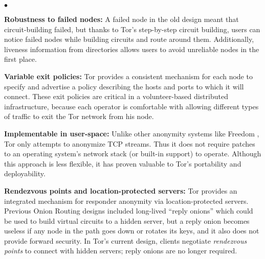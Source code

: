 \documentclass[times,10pt,twocolumn]{article}
\newenvironment{tightlist}{\begin{list}{$\bullet$}{
  \setlength{\itemsep}{0mm}
    \setlength{\parsep}{0mm}
    }}{\end{list}}
\begin{document}
\begin{tightlist}
\item \textbf{Robustness to failed nodes:} A failed node in the old design
meant that circuit-building failed, but thanks to Tor's step-by-step
circuit building, users can notice failed
nodes while building circuits and route around them.  Additionally,
liveness information from directories allows users to avoid
unreliable nodes in the first place.
%

\item \textbf{Variable exit policies:} Tor provides a consistent
mechanism for
each node to specify and advertise a policy describing the hosts and
ports to which it will connect. These exit policies
are critical in a volunteer-based distributed infrastructure, because
each operator is comfortable with allowing different types of traffic
to exit the Tor network from his node.

\item \textbf{Implementable in user-space:} Unlike other anonymity systems
like Freedom \cite{freedom2-arch}, Tor only attempts to anonymize TCP
streams. Thus it does not require patches to an operating system's network
stack (or built-in support) to operate.  Although this approach is less
flexible, it has proven valuable to Tor's portability and deployability.

\item \textbf{Rendezvous points and location-protected servers:}
Tor provides an integrated mechanism for responder anonymity via
location-protected servers.  Previous Onion Routing designs included
long-lived ``reply onions'' which could be used to build virtual circuits
to a hidden server, but a reply onion becomes useless if any node in
the path goes down or rotates its keys, and it also does not provide
forward security.  In Tor's current design, clients negotiate {\it
rendezvous points} to connect with hidden servers; reply onions are no
longer required.
\end{tightlist}
\end{document}
